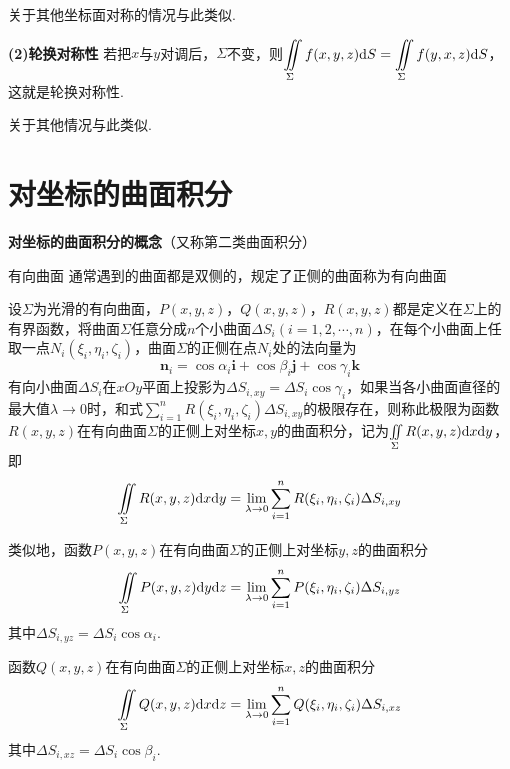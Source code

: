 关于其他坐标面对称的情况与此类似.

\textbf{(2)轮换对称性}
若把$x$与$y$对调后，$\Sigma$不变，则$\displaystyle\iint\limits_{\Sigma}f(x,y,z)\mathrm{d} S=\iint\limits_{\Sigma}f(y,x,z)\mathrm{d} S$，这就是轮换对称性.

关于其他情况与此类似.

\section{对坐标的曲面积分}

\textbf{对坐标的曲面积分的概念}（又称第二类曲面积分）

有向曲面 \quad 通常遇到的曲面都是双侧的，规定了正侧的曲面称为有向曲面

设$\Sigma$为光滑的有向曲面，$P(x,y,z)$，$Q(x,y,z)$，$R(x,y,z)$都是定义在$\Sigma$上的有界函数，将曲面$\Sigma$任意分成$n$个小曲面$\Delta S_i(i=1,2,\cdots,n)$，在每个小曲面上任取一点$N_i(\xi_i,\eta_i,\zeta_i)$，曲面$\Sigma$的正侧在点$N_i$处的法向量为
\begin{equation*}
    \bm{n}_i=\cos\alpha_i\bm{i}+\cos\beta_i\bm{j}+\cos\gamma_i\bm{k}
\end{equation*}
有向小曲面$\Delta S_i$在$xOy$平面上投影为$\Delta S_{i,xy}=\Delta S_i\cos\gamma_i$，如果当各小曲面直径的最大值$\lambda\rightarrow 0$时，和式$\sum_{i=1}^n R(\xi_i,\eta_i,\zeta_i)\Delta S_{i,xy}$的极限存在，则称此极限为函数$R(x,y,z)$在有向曲面$\Sigma$的正侧上对坐标$x,y$的曲面积分，记为$\iint \limits_{\Sigma}R(x,y,z)\mathrm{d} x\mathrm{d} y$，即
\begin{equation*}
    \iint \limits_{\Sigma}R(x,y,z)\mathrm{d} x\mathrm{d} y=\lim_{\lambda\rightarrow 0}\sum_{i=1}^n R(\xi_i,\eta_i,\zeta_i)\Delta S_{i,xy}
\end{equation*}

类似地，函数$P(x,y,z)$在有向曲面$\Sigma$的正侧上对坐标$y,z$的曲面积分
\begin{equation*}
    \iint \limits_{\Sigma}P(x,y,z)\mathrm{d} y\mathrm{d} z=\lim_{\lambda\rightarrow 0}\sum_{i=1}^n P(\xi_i,\eta_i,\zeta_i)\Delta S_{i,yz}
\end{equation*}
其中$\Delta S_{i,yz}=\Delta S_i\cos\alpha_i$.

函数$Q(x,y,z)$在有向曲面$\Sigma$的正侧上对坐标$x,z$的曲面积分
\begin{equation*}
    \iint \limits_{\Sigma}Q(x,y,z)\mathrm{d} x\mathrm{d} z=\lim_{\lambda\rightarrow 0}\sum_{i=1}^n Q(\xi_i,\eta_i,\zeta_i)\Delta S_{i,xz}
\end{equation*}
其中$\Delta S_{i,xz}=\Delta S_i\cos\beta_i$.

